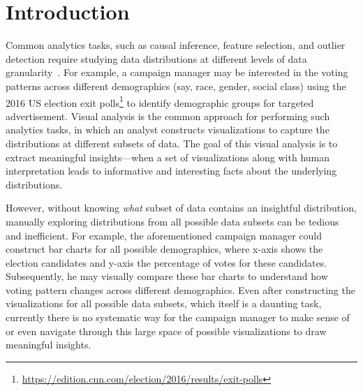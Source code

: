 \section{Introduction}
\par Common analytics tasks, such as causal inference, feature selection, and outlier detection require studying data distributions at different levels of data granularity~\cite{Anand2015,Wu2013,Heer2012}. For example, a campaign manager may be interested in the voting patterns across different demographics (say, race, gender, social class) using the 2016 US election exit polls\footnote{\url{https://edition.cnn.com/election/2016/results/exit-polls}} to identify demographic groups for targeted advertisement. Visual analysis is the common approach for performing such analytics tasks, in which an analyst constructs visualizations to capture the distributions at different subsets of data. The goal of this visual analysis is to extract meaningful insights---when a set of visualizations along with human interpretation leads to informative and interesting facts about the underlying distributions.

\par However, without knowing \textit{what} subset of data contains an insightful distribution, manually exploring distributions from all possible data subsets can be tedious and inefficient. For example, the aforementioned campaign manager could construct bar charts for all possible demographics, where x-axis shows the election candidates and y-axis the percentage of votes for these candidates. Subsequently, he may visually compare these bar charts to understand how voting pattern changes across different demographics. Even after constructing the visualizations for all possible data subsets, which itself is a daunting task, currently there is no systematic way for the campaign manager to make sense of or even navigate through this large space of possible visualizations to draw meaningful insights. %

